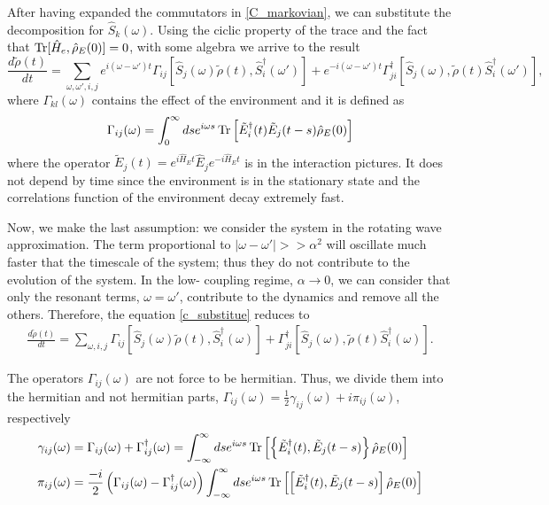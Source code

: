 After having expanded the commutators in \eqref{C_markovian}, we can substitute the decomposition for $\hat S_k(\omega)$. Using the ciclic property of the trace and the fact that $\operatorname{Tr}[\hat H_e,\hat\rho_E(0)]=0$, with some algebra we arrive to the result
\begin{equation}\label{c_substitue}
    \frac{d\tilde\rho(t)}{dt} = \sum_{\omega,\omega',i,j}e^{i(\omega-\omega')t}\Gamma_{ij}\left[\hat S_j(\omega)\tilde\rho(t),\hat S_i^\dagger(\omega')\right]+ e^{-i(\omega-\omega')t}\Gamma_{ji}^\dagger\left[\hat S_j(\omega),\tilde\rho(t)\hat S_i^\dagger(\omega')\right],
\end{equation}
where $\Gamma_{kl}(\omega)$ contains the effect of the environment and it is defined as
\begin{equation}\label{environment_coefficients}
    \Gamma_{ij}(\omega) = \int_{0}^{\infty}ds e^{i\omega s}\operatorname{Tr}\left[\tilde E_i^\dagger(t)\tilde E_j(t-s)\hat\rho_E(0)\right]
\end{equation}
where the operator $\tilde E_j(t)=e^{i\hat H_E t}\hat E_j e^{-i\hat H_E t}$ is in the interaction pictures. It does not depend by time since the environment is in the stationary state and the correlations function of the environment decay extremely fast.

Now, we make the last assumption: we consider the system in the rotating wave approximation. The term proportional to $|\omega-\omega'| >> \alpha^2$ will oscillate much faster that the timescale of the system; thus they do not contribute to the evolution of the system. In the low-
coupling regime, $\alpha\rightarrow 0$, we can consider that only the resonant terms, $\omega=\omega'$, contribute to the dynamics and
remove all the others. Therefore, the equation \eqref{c_substitue} reduces to
\begin{eqnarray}\label{C_rotating_wave}
    \frac{d\tilde\rho(t)}{dt} = \sum_{\omega,i,j}\Gamma_{ij}\left[\hat S_j(\omega)\tilde\rho(t),\hat S_i^\dagger(\omega)\right]+\Gamma_{ji}^\dagger\left[\hat S_j(\omega),\tilde\rho(t)\hat S_i^\dagger(\omega)\right].
\end{eqnarray}

The operators $\Gamma_{ij}(\omega)$ are not force to be hermitian. Thus, we divide them into the hermitian and not hermitian parts, $\Gamma_{ij}(\omega) =\frac{1}{2}\gamma_{ij}(\omega)+i\pi_{ij}(\omega)$, respectively
\begin{equation}
    \begin{split}
        \gamma_{ij}(\omega) &=   \Gamma_{ij}(\omega) + \Gamma_{ij}^\dagger(\omega) = \int_{-\infty}^\infty ds e^{i\omega s}\operatorname{Tr}\left[\left\{\tilde E_i^\dagger(t),\tilde E_j(t-s)\right\}\hat\rho_E(0)\right]\\
        \pi_{ij}(\omega) &= \frac{-i}{2}\left(\Gamma_{ij}(\omega)-\Gamma_{ij}^\dagger(\omega)\right)\int_{-\infty}^\infty ds e^{i\omega s}\operatorname{Tr}\left[\left[\tilde E_i^\dagger(t),\tilde E_j(t-s)\right]\hat\rho_E(0)\right]\\
    \end{split}
\end{equation}

